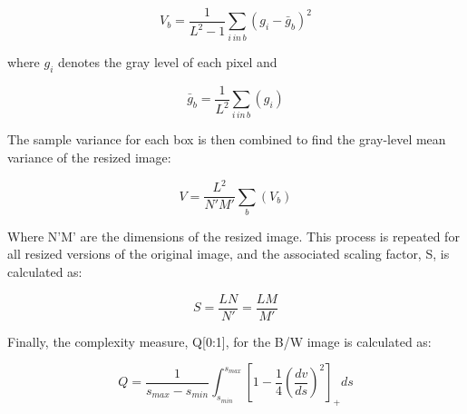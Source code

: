 \documentclass[12pt]{article}
\begin{document}
\begin{equation}
	V_b = \frac{1}{L^2-1}\sum_{i\,in\,b}(g_i-\bar{g}_b)^2
	\label{eq:Q1}
\end{equation} 

where $g_i$ denotes the gray level of each pixel and

\begin{equation}
	\bar{g}_b = \frac{1}{L^2}\sum_{i\,in\,b}(g_i)
	\label{eq:Q2}
\end{equation} 

The sample variance for each box is then combined to find the gray-level mean variance of the resized image:

\begin{equation}
	V = \frac{L^2}{N'M'}\sum_{b}(V_b)
	\label{eq:Q3}
\end{equation} 

Where N'M' are the dimensions of the resized image. This process is repeated for all resized versions of the original image, and the associated scaling factor, S, is calculated as:

\begin{equation}
	S = \frac{LN}{N'} = \frac{LM}{M'}
	\label{eq:Q4}
\end{equation} 

Finally, the complexity measure, Q[0:1], for the B/W image is calculated as: 

\begin{equation}
	Q = \frac{1}{s_{max}-s_{min}}\int_{s_{min}}^{s_{max}} \left[1-\frac{1}{4} \left(\frac{dv}{ds}\right)^2 \right]_+ds
	\label{eq:Q5}
\end{equation} 
\end{document}
